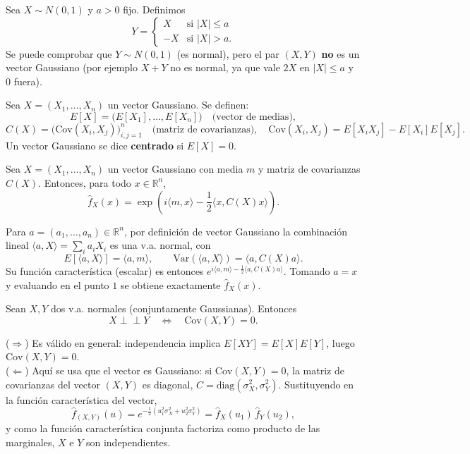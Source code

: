 \begin{ejemplo}
Sea $X\sim N(0,1)$ y $a>0$ fijo. Definimos
\[
Y = \begin{cases} X & \text{si } |X|\le a \\ -X & \text{si } |X|> a.\end{cases}
\]
Se puede comprobar que $Y\sim N(0,1)$ (es normal), pero el par $(X,Y)$ \textbf{no} es un vector Gaussiano (por ejemplo $X+Y$ no es normal, ya que vale $2X$ en $|X|\le a$ y $0$ fuera).
\end{ejemplo}

\begin{definicion}
Sea $X=(X_1,\dots,X_n)$ un vector Gaussiano. Se definen:
\[
E[X] = \big(E[X_1],\dots,E[X_n]\big) \quad\text{(vector de medias)},
\]
\[
C(X) = \big(\text{Cov}(X_i,X_j)\big)_{i,j=1}^n \quad\text{(matriz de covarianzas)}, \quad \text{Cov}(X_i,X_j) = E[X_iX_j]-E[X_i]E[X_j].
\]
Un vector Gaussiano se dice \textbf{centrado} si $E[X]=0$.
\end{definicion}

\begin{teo}
    Sea $X=(X_1,\dots,X_n)$ un vector Gaussiano con media $m$ y matriz de covarianzas $C(X)$. Entonces, para todo $x\in\mathbb{R}^n$,
    \[
    \hat{f}_X(x) = \exp\left(i\langle m,x\rangle - \frac{1}{2}\langle x, C(X) x\rangle\right).
    \]
\end{teo}
\begin{observacion}
    Para $a=(a_1,\dots,a_n)\in\mathbb{R}^n$, por definición de vector Gaussiano la combinación lineal $\langle a,X\rangle = \sum_i a_iX_i$ es una v.a. normal, con
    \[
    E[\langle a,X\rangle] = \langle a,m\rangle, \qquad \text{Var}(\langle a,X\rangle) = \langle a, C(X) a\rangle.
    \]
    Su función característica (escalar) es entonces $e^{i\langle a,m\rangle - \frac{1}{2}\langle a,C(X)a\rangle}$. Tomando $a=x$ y evaluando en el punto $1$ se obtiene exactamente $\hat f_X(x)$.
\end{observacion}

\begin{prop}
    Sean $X,Y$ dos v.a. normales (conjuntamente Gaussianas). Entonces
    \[
    X \perp\!\!\!\perp Y \quad \Longleftrightarrow \quad \text{Cov}(X,Y)=0.
    \]
\end{prop}
\begin{observacion}
    ($\Rightarrow$) Es válido en general: independencia implica $E[XY]=E[X]E[Y]$, luego $\text{Cov}(X,Y)=0$. \\
    ($\Leftarrow$) Aquí se usa que el vector es Gaussiano: si $\text{Cov}(X,Y)=0$, la matriz de covarianzas del vector $(X,Y)$ es diagonal, $C=\text{diag}(\sigma_X^2,\sigma_Y^2)$. Sustituyendo en la función característica del vector,
    \[
    \hat f_{(X,Y)}(u) = e^{-\frac{1}{2}(u_1^2\sigma_X^2+u_2^2\sigma_Y^2)} = \hat f_X(u_1)\,\hat f_Y(u_2),
    \]
    y como la función característica conjunta factoriza como producto de las marginales, $X$ e $Y$ son independientes.
\end{observacion}

